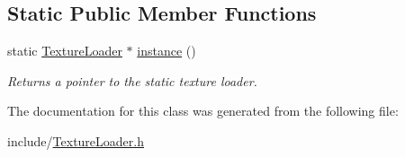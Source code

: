 \subsection*{Static Public Member Functions}
\begin{DoxyCompactItemize}
\item 
\mbox{\label{class_texture_loader_a530f60fd59904b00f0847f716afe51ab}} 
static \hyperlink{class_texture_loader}{Texture\+Loader} $\ast$ \hyperlink{class_texture_loader_a530f60fd59904b00f0847f716afe51ab}{instance} ()
\begin{DoxyCompactList}\small\item\em Returns a pointer to the static texture loader. \end{DoxyCompactList}\end{DoxyCompactItemize}


The documentation for this class was generated from the following file\+:\begin{DoxyCompactItemize}
\item 
include/\hyperlink{_texture_loader_8h}{Texture\+Loader.\+h}\end{DoxyCompactItemize}
